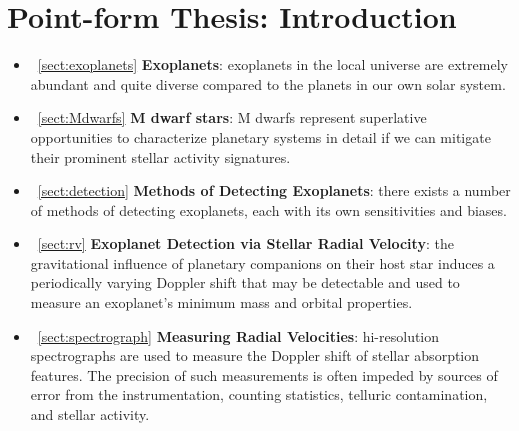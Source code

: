 \section{Point-form Thesis: Introduction}
\begin{itemize}
\renewcommand\labelitemi{--}
\item~\ref{sect:exoplanets} \textbf{Exoplanets}: exoplanets in the local universe are 
  extremely abundant and quite diverse compared to the planets in our own solar system.
\item~\ref{sect:Mdwarfs} \textbf{M dwarf stars}: M dwarfs represent superlative opportunities
  to characterize planetary systems in detail if we can mitigate their prominent stellar activity
  signatures.
\item~\ref{sect:detection} \textbf{Methods of Detecting Exoplanets}: there exists a 
number of methods of detecting exoplanets, each with its own sensitivities and biases.
\item~\ref{sect:rv} \textbf{Exoplanet Detection via Stellar Radial Velocity}: the 
  gravitational influence of planetary companions on their host star induces a periodically
  varying Doppler shift that may be detectable and used to measure an exoplanet's minimum mass
  and orbital properties.
\item~\ref{sect:spectrograph} \textbf{Measuring Radial Velocities}: hi-resolution 
  spectrographs are used to measure the Doppler shift of stellar absorption features.
  The precision of such measurements is often impeded by sources of error from the
  instrumentation, counting statistics, telluric contamination, and stellar activity.
\end{itemize}

